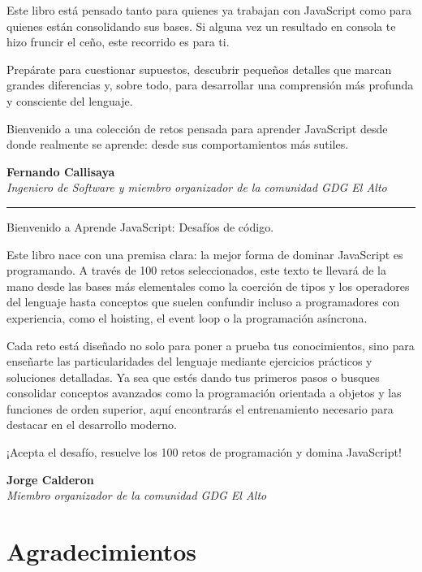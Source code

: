 \documentclass[
  letterpaper,
  DIV=11,
  numbers=noendperiod]{scrreprt}
\begin{document}
Este libro está pensado tanto para quienes ya trabajan con JavaScript
como para quienes están consolidando sus bases. Si alguna vez un
resultado en consola te hizo fruncir el ceño, este recorrido es para ti.

Prepárate para cuestionar supuestos, descubrir pequeños detalles que
marcan grandes diferencias y, sobre todo, para desarrollar una
comprensión más profunda y consciente del lenguaje.

Bienvenido a una colección de retos pensada para aprender JavaScript
desde donde realmente se aprende: desde sus comportamientos más sutiles.

\textbf{Fernando Callisaya}\\
\emph{Ingeniero de Software y miembro organizador de la comunidad GDG El
Alto}

\begin{center}\rule{0.5\linewidth}{0.5pt}\end{center}

Bienvenido a Aprende JavaScript: Desafíos de código.

Este libro nace con una premisa clara: la mejor forma de dominar
JavaScript es programando. A través de 100 retos seleccionados, este
texto te llevará de la mano desde las bases más elementales como la
coerción de tipos y los operadores del lenguaje hasta conceptos que
suelen confundir incluso a programadores con experiencia, como el
hoisting, el event loop o la programación asíncrona.

Cada reto está diseñado no solo para poner a prueba tus conocimientos,
sino para enseñarte las particularidades del lenguaje mediante
ejercicios prácticos y soluciones detalladas. Ya sea que estés dando tus
primeros pasos o busques consolidar conceptos avanzados como la
programación orientada a objetos y las funciones de orden superior, aquí
encontrarás el entrenamiento necesario para destacar en el desarrollo
moderno.

¡Acepta el desafío, resuelve los 100 retos de programación y domina
JavaScript!

\textbf{Jorge Calderon}\\
\emph{Miembro organizador de la comunidad GDG El Alto}


\chapter*{Agradecimientos}\label{agradecimientos}
\end{document}
